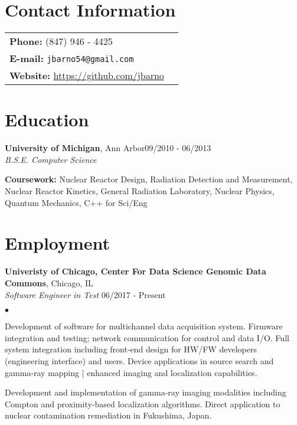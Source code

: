 \documentclass[margin,line]{res}
\newenvironment{list1}{
  \begin{list}{\ding{113}}{%
      \setlength{\itemsep}{0in}
      \setlength{\parsep}{0in} \setlength{\parskip}{0in}
      \setlength{\topsep}{0in} \setlength{\partopsep}{0in} 
      \setlength{\leftmargin}{0.17in}}}{\end{list}}
\newenvironment{list2}{
  \begin{list}{$\bullet$}{%
      \setlength{\itemsep}{0in}
      \setlength{\parsep}{0in} \setlength{\parskip}{0in}
      \setlength{\topsep}{0in} \setlength{\partopsep}{0in} 
      \setlength{\leftmargin}{0.2in}}}{\end{list}}
\begin{document}
\address{\large 5467 S Ingleside Ave APT 3W, Chicago IL, 60615} 

\begin{resume}
\section{\sc Contact Information}
\vspace{.05in}
\begin{tabular}{@{}p{3in}p{4in}}
{\bf Phone:}   (847) 946 - 4425\\            
{\bf E-mail:}  {\tt jbarno54@gmail.com} \\       
{\bf Website:} \url{https://github.com/jbarno} \\     
\end{tabular}


\section{\sc Education}
{\bf University of Michigan}, Ann Arbor\hfill 09/2010 - 06/2013\\
    {\em B.S.E. Computer Science}
\begin{list1}
\item[] {\bf \small Coursework:} Nuclear Reactor Design, Radiation Detection 
                                 and Measurement, Nuclear Reactor Kinetics,
                                 General Radiation Laboratory, Nuclear Physics,
                                 Quantum Mechanics, C++ for Sci/Eng
\end{list1}


\section{\sc Employment}
\begin{list1}
{\bf Univeristy of Chicago, Center For Data Science Genomic Data Commons}, Chicago, IL\\
{\em Software Engineer in Test} \hfill 06/2017 - Present

  \begin{list2}
    \item Development of software for multichannel data acquisition system.
          Firmware integration and testing; network communication for control and data I/O.
          Full system integration including front-end design for HW/FW developers
          (engineering interface) and users.
          Device applications in source search and gamma-ray mapping | enhanced imaging
          and localization capabilities.
    \item Development and implementation of gamma-ray imaging modalities including
          Compton and proximity-based localization algorithms.
          Direct application to nuclear contamination remediation in 
          Fukushima, Japan.
  \end{list2}
\end{list1}


\end{resume}
\end{document}

